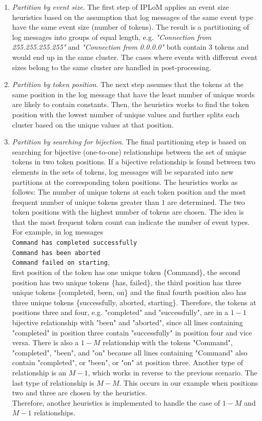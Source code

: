 \begin{enumerate}
    \item \textit{Partition by event size}. The first step of IPLoM applies an event size heuristics based on the assumption that log messages of the same event type have the same event size (number of tokens). The result is a partitioning of log messages into groups of equal length, e.g. \textit{"Connection from 255.255.255.255"} and \textit{"Connection from 0.0.0.0"} both contain $3$ tokens and would end up in the same cluster. The cases where events with different event sizes belong to the same cluster are handled in post-processing.
    
    \item \textit{Partition by token position}. The next step assumes that the tokens at the same position in the log message that have the least number of unique words are likely to contain constants. Then, the heuristics works to find the token position with the lowest number of unique values and further splits each cluster based on the unique values at that position. 
    
    \item \textit{Partition by searching for bijection}. The final partitioning step is based on searching for bijective (one-to-one) relationships between the set of unique tokens in two token positions. If a bijective relationship is found between two elements in the sets of tokens, log messages will be separated into new partitions at the corresponding token positions. The heuristics works as follows: The number of unique tokens at each token position and the most frequent number of unique tokens greater than $1$ are determined. The two token positions with the highest number of tokens are chosen. The idea is that the most frequent token count can indicate the number of event types. For example, in log messages\\ \texttt{Command has completed successfully} \\ \texttt{Command has been aborted} \\ \texttt{Command failed on starting}, \\ first position of the token has one unique token \{Command\}, the second position has two unique tokens \{has, failed\}, the third position has three unique tokens \{completed, been, on\} and the final fourth position also has three unique tokens \{successfully, aborted, starting\}. Therefore, the tokens at positions three and four, e.g. "completed" and "successfully", are in a $1-1$ bijective relationship with "been" and "aborted", since all lines containing "completed" in position three contain "successfully" in position four and vice versa. There is also a $1-M$ relationship with the tokens "Command", "completed", "been", and "on" because all lines containing "Command" also contain "completed", or "been", or "on" at position three. Another type of relationship is an $M-1$, which works in reverse to the previous scenario. The last type of relationship is $M-M$. This occurs in our example when positions two and three are chosen by the heuristics. \\ Therefore, another heuristics is implemented to handle the case of $1-M$ and $M-1$ relationships. 
    

\end{enumerate}
